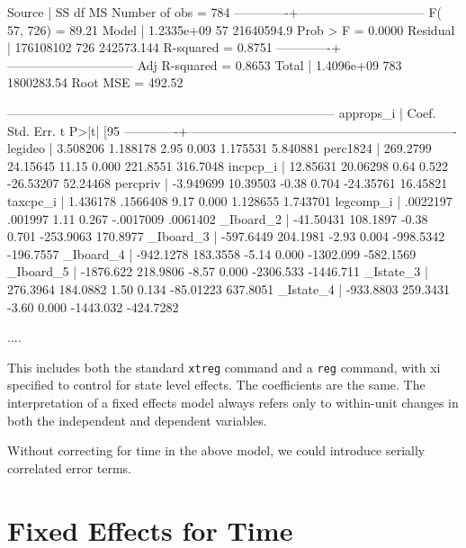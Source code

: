 \documentclass[12pt]{article}
\begin{document}
\begin{stlog}
      Source |       SS       df       MS              Number of obs =     784
-------------+------------------------------           F( 57,   726) =   89.21
       Model |  1.2335e+09    57  21640594.9           Prob > F      =  0.0000
    Residual |   176108102   726  242573.144           R-squared     =  0.8751
-------------+------------------------------           Adj R-squared =  0.8653
       Total |  1.4096e+09   783  1800283.54           Root MSE      =  492.52

------------------------------------------------------------------------------
   approps_i |      Coef.   Std. Err.      t    P>|t|     [95%
-------------+----------------------------------------------------------------
     legideo |   3.508206   1.188178     2.95   0.003     1.175531    5.840881
    perc1824 |   269.2799   24.15645    11.15   0.000     221.8551    316.7048
    incpcp_i |   12.85631   20.06298     0.64   0.522    -26.53207    52.24468
    percpriv |  -3.949699   10.39503    -0.38   0.704    -24.35761    16.45821
    taxcpc_i |   1.436178   .1566408     9.17   0.000     1.128655    1.743701
   legcomp_i |   .0022197    .001997     1.11   0.267    -.0017009    .0061402
   _Iboard_2 |  -41.50431   108.1897    -0.38   0.701    -253.9063    170.8977
   _Iboard_3 |  -597.6449   204.1981    -2.93   0.004    -998.5342   -196.7557
   _Iboard_4 |  -942.1278   183.3558    -5.14   0.000    -1302.099   -582.1569
   _Iboard_5 |  -1876.622   218.9806    -8.57   0.000    -2306.533   -1446.711
   _Istate_3 |   276.3964   184.0882     1.50   0.134    -85.01223    637.8051
   _Istate_4 |  -933.8803   259.3431    -3.60   0.000    -1443.032
   -424.7282

....
  
\end{stlog}

This includes both the standard \texttt{xtreg} command and a
\texttt{reg} command, with xi specified to control for state level
effects. The coefficients are the same.  The interpretation of a fixed
effects model always refers only to within-unit changes in both the
independent and dependent variables. 

Without correcting for time in the above model, we could introduce
serially correlated error terms.

\section{Fixed Effects for Time}
\end{document}
